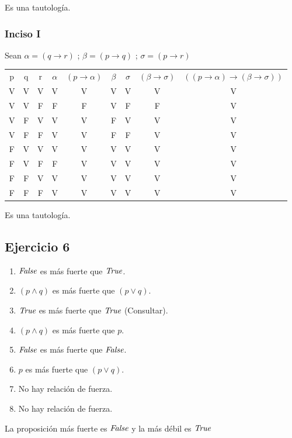 Es una tautología.

\subsubsection{Inciso I}

Sean $\alpha = (q\rightarrow r)$ ; $\beta = (p \rightarrow q)$ ; $\sigma = (p \rightarrow r)$

\begin{tabular}{c|c|c|c|c|c|c|c|c}
    p & q & r & $\alpha$ & $(p \rightarrow \alpha)$ & $\beta$ & $\sigma$ & $(\beta \rightarrow \sigma)$ & $((p \rightarrow \alpha) \rightarrow (\beta \rightarrow \sigma))$\\
    V & V & V & V & V & V & V & V & V \\
    V & V & F & F & F & V & F & F & V \\
    V & F & V & V & V & F & V & V & V \\
    V & F & F & V & V & F & F & V & V \\
    F & V & V & V & V & V & V & V & V \\
    F & V & F & F & V & V & V & V & V \\
    F & F & V & V & V & V & V & V & V \\
    F & F & F & V & V & V & V & V & V
\end{tabular}

Es una tautología.

\subsection{Ejercicio 6}
\begin{enumerate}[label=(\alph*)]
    \item $\emph{False}$ es más fuerte que $\emph{True}$.
    \item $(p \wedge q)$ es más fuerte que $(p \vee q)$.
    \item $\emph{True}$ es más fuerte que $\emph{True}$ (Consultar).
    \item $(p \wedge q)$ es más fuerte que $p$.
    \item $\emph{False}$ es más fuerte que $\emph{False}$.
    \item $p$ es más fuerte que $(p\vee q)$.
    \item No hay relación de fuerza.
    \item No hay relación de fuerza.
\end{enumerate}

La proposición más fuerte es $\emph{False}$ y la más débil es $\emph{True}$

